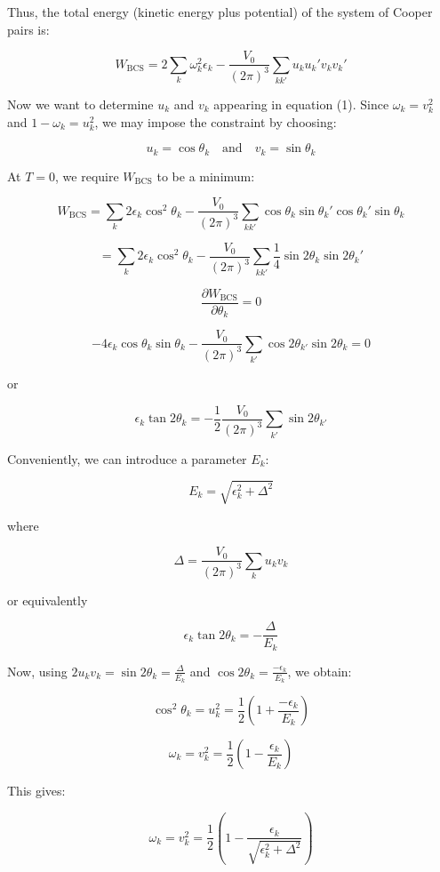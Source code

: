 \documentclass{article}
\begin{document}
Thus, the total energy (kinetic energy plus potential) of the system of Cooper pairs is:

\[
W_{\text{BCS}} = 2 \sum_k \omega_k^2 \epsilon_k - \frac{V_0}{(2\pi)^3} \sum_{k k'} u_k u_k' v_k v_k'
\]

Now we want to determine \( u_k \) and \( v_k \) appearing in equation (1). Since \( \omega_k = v_k^2 \) and \( 1 - \omega_k = u_k^2 \), we may impose the constraint by choosing:

\[
u_k = \cos \theta_k \quad \text{and} \quad v_k = \sin \theta_k \tag{5}
\]

At \( T = 0 \), we require \( W_{\text{BCS}} \) to be a minimum:

\[
W_{\text{BCS}} = \sum_k 2 \epsilon_k \cos^2 \theta_k - \frac{V_0}{(2\pi)^3} \sum_{k k'} \cos \theta_k \sin \theta_k' \cos \theta_k' \sin \theta_k
\]

\[
= \sum_k 2 \epsilon_k \cos^2 \theta_k - \frac{V_0}{(2\pi)^3} \sum_{k k'} \frac{1}{4} \sin 2\theta_k \sin 2\theta_k' \tag{6}
\]

\[
\frac{\partial W_{\text{BCS}}}{\partial \theta_k} = 0
\]

\[
-4 \epsilon_k \cos \theta_k \sin \theta_k - \frac{V_0}{(2\pi)^3} \sum_{k'} \cos 2\theta_{k'} \sin 2\theta_k = 0
\]

or

\[
\epsilon_k \tan 2\theta_k = -\frac{1}{2} \frac{V_0}{(2\pi)^3} \sum_{k'} \sin 2\theta_{k'}
\]

Conveniently, we can introduce a parameter \( E_k \):

\[
E_k = \sqrt{\epsilon_k^2 + \Delta^2}
\]

where

\[
\Delta = \frac{V_0}{(2\pi)^3} \sum_k u_k v_k
\]

or equivalently

\[
\epsilon_k \tan 2\theta_k = -\frac{\Delta}{E_k} \tag{*1}
\]

Now, using \( 2 u_k v_k = \sin 2\theta_k = \frac{\Delta}{E_k} \) and \( \cos 2\theta_k = \frac{-\epsilon_k}{E_k} \), we obtain:

\[
\cos^2 \theta_k = u_k^2 = \frac{1}{2} \left( 1 + \frac{-\epsilon_k}{E_k} \right)
\]

\[
\omega_k = v_k^2 = \frac{1}{2} \left( 1 - \frac{\epsilon_k}{E_k} \right)
\]

This gives:

\[
\omega_k = v_k^2 = \frac{1}{2} \left( 1 - \frac{\epsilon_k}{\sqrt{\epsilon_k^2 + \Delta^2}} \right)
\]
\end{document}
